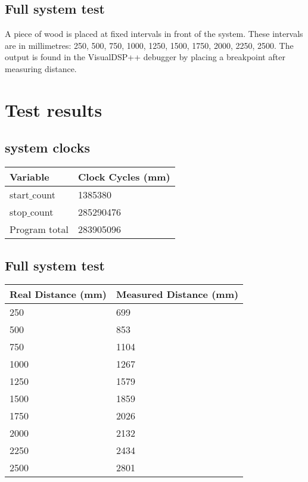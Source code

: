 \subsection{Full system test}
A piece of wood is placed at fixed intervals in front of the system. These intervals are in millimetres: 250, 500, 750, 1000, 1250, 1500, 1750, 2000, 2250, 2500. The output is found in the VisualDSP++ debugger by placing a breakpoint after measuring distance. 

\section{Test results}
\subsection{system clocks}
\begin{table}[H]
\centering
    \begin{tabular}{|l|l|}
    \hline
    Variable           & Clock Cycles (mm) \\ \hline
    start$\_$count        & 1385380           \\ \hline
    stop$\_$count         & 285290476         \\ \hline
    Program total      & 283905096         \\ \hline
    \end{tabular}
\end{table}
\subsection{Full system test}
\begin{table}[H]
\centering
    \begin{tabular}{|l|l|}
    \hline
    Real Distance (mm) & Measured Distance (mm) \\ \hline
    250                & 699                    \\ \hline
    500                & 853                    \\ \hline
    750                & 1104                   \\ \hline
    1000               & 1267                   \\ \hline
    1250               & 1579                   \\ \hline
    1500               & 1859                   \\ \hline
    1750               & 2026                   \\ \hline
    2000               & 2132                   \\ \hline
    2250               & 2434                   \\ \hline
    2500               & 2801                   \\ \hline
    \end{tabular}
\end{table}
